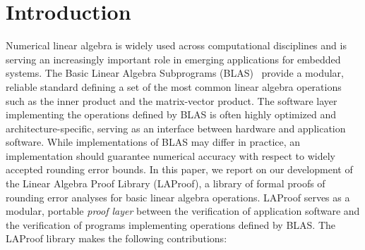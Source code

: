 \section{Introduction}\label{sec:introduction}
Numerical linear algebra is widely used across computational
disciplines and is serving an increasingly important role in
emerging applications for embedded systems. The Basic Linear
Algebra Subprograms (BLAS)~\cite{blas02,blast} provide a
modular, reliable standard defining a set of the most common
linear algebra operations such as the inner product and the
matrix-vector product. The software layer implementing the
operations defined by BLAS is often highly optimized and
architecture-specific, serving as an interface between hardware
and application software. While implementations of BLAS may
differ in practice,  an implementation
should guarantee numerical accuracy
with respect to widely accepted rounding error bounds. In this
paper, we report on our development of the
Linear Algebra Proof Library (LAProof), a library of formal
proofs of rounding error analyses for basic linear algebra
operations. LAProof serves as a
modular, portable \emph{proof layer} between the verification of application software and the verification of programs
implementing operations defined by BLAS. The LAProof library
makes the following contributions:

